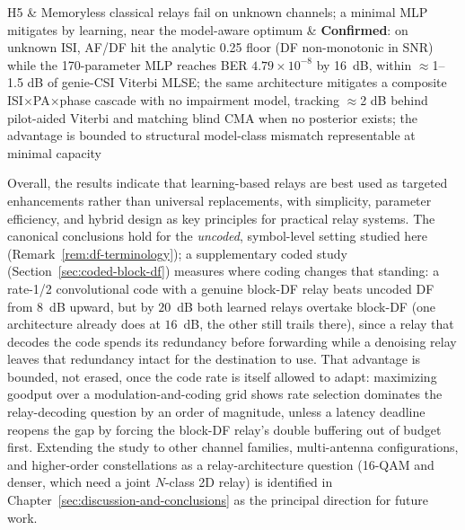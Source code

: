 \begin{longtable}[]
H5 & Memoryless classical relays fail on unknown channels; a minimal MLP mitigates by learning, near the model-aware optimum & \textbf{Confirmed}: on unknown ISI, AF/DF hit the analytic 0.25 floor (DF non-monotonic in SNR) while the 170-parameter MLP reaches BER $4.79\times10^{-8}$ by 16~dB, within $\approx$1--1.5 dB of genie-CSI Viterbi MLSE; the same architecture mitigates a composite ISI$\times$PA$\times$phase cascade with no impairment model, tracking $\approx$2 dB behind pilot-aided Viterbi and matching blind CMA when no posterior exists; the advantage is bounded to structural model-class mismatch representable at minimal capacity \\
\end{longtable}

Overall, the results indicate that learning-based relays are best used as targeted enhancements rather than universal replacements, with simplicity, parameter efficiency, and hybrid design as key principles for practical relay systems. The canonical conclusions hold for the \emph{uncoded}, symbol-level setting studied here (Remark~\ref{rem:df-terminology}); a supplementary coded study (Section~\ref{sec:coded-block-df}) measures where coding changes that standing: a rate-1/2 convolutional code with a genuine block-DF relay beats uncoded DF from $8$~dB upward, but by $20$~dB both learned relays overtake block-DF (one architecture already does at $16$~dB, the other still trails there), since a relay that decodes the code spends its redundancy before forwarding while a denoising relay leaves that redundancy intact for the destination to use. That advantage is bounded, not erased, once the code rate is itself allowed to adapt: maximizing goodput over a modulation-and-coding grid shows rate selection dominates the relay-decoding question by an order of magnitude, unless a latency deadline reopens the gap by forcing the block-DF relay's double buffering out of budget first. Extending the study to other channel families, multi-antenna configurations, and higher-order constellations as a relay-architecture question (16-QAM and denser, which need a joint $N$-class 2D relay) is identified in Chapter~\ref{sec:discussion-and-conclusions} as the principal direction for future work.
